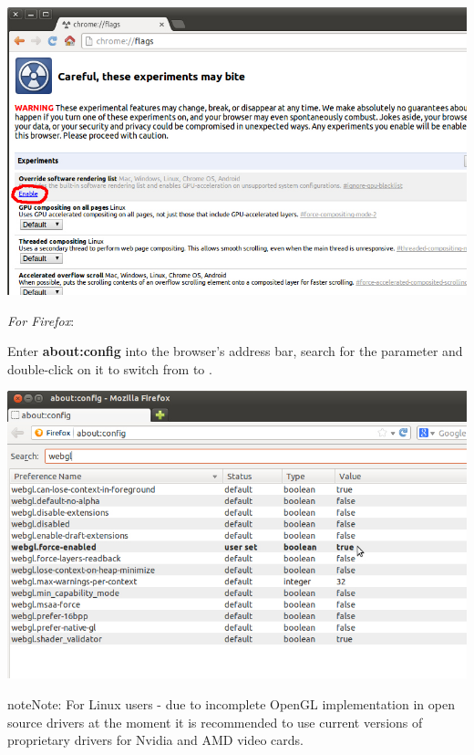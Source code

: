 \documentclass[a4paper,12pt,oneside]{sphinxmanual}
\begin{document}
\begin{DUlineblock}{0em}
\item[] 
\end{DUlineblock}

{\hfill\includegraphics[width=1.000\linewidth]{about_flags_force_webgl.jpg}\hfill}

\begin{DUlineblock}{0em}
\item[] 
\end{DUlineblock}

\emph{For Firefox}:

Enter \textbf{about:config} into the browser's address bar, search for the  parameter and double-click on it to switch from  to .

{\hfill\includegraphics[width=1.000\linewidth]{about_config_force_webgl.jpg}\hfill}

\begin{notice}{note}{Note:}
For Linux users - due to incomplete OpenGL implementation in open source drivers at the moment it is recommended to use current versions of proprietary drivers for Nvidia and AMD video cards.
\end{notice}
\end{document}
